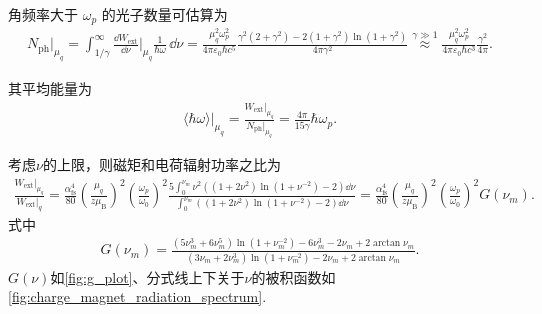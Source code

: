 角频率大于 \(\omega_{p}\) 的光子数量可估算为
\begin{align*}
	N_{\mathrm{ph}}\big|_{\mu_q} = \int_{1/\gamma}^{\infty} \frac{\dd  W_{\mathrm{ext}}}{\dd \nu}\bigg|_{\mu_q} \frac{1}{\hbar \omega} \, \dd \nu = \frac{\mu_{q}^{2} \omega_{p}^{2}}{4\pi \varepsilon_{0} \hbar c^{5}} \frac{\gamma^{2} (2 + \gamma^{2}) - 2(1 + \gamma^{2}) \ln(1 + \gamma^{2})}{4\pi \gamma^{2}} \overset{\gamma \gg 1}{\approx} \frac{\mu_{q}^{2} \omega_{p}^{2}}{4\pi \varepsilon_{0} \hbar c^{3}} \frac{\gamma^{2}}{4\pi}.
\end{align*}

其平均能量为
\begin{align*}
	\langle \hbar\omega \rangle\big|_{\mu_q} = \frac{W_{\mathrm{ext}}|_{\mu_q}}{N_{\mathrm{ph}}|_{\mu_q}} = \frac{4\pi}{15 \gamma} \hbar\omega_{p}.
\end{align*}

考虑\(\nu\)的上限，则磁矩和电荷辐射功率之比为
\begin{align*}
	\frac{W_{\mathrm{ext}}|_{\mu_{q}}}{W_{\mathrm{ext}}|_{q}} = \frac{\alpha_{\mathrm{fs}}^{4}}{80} \left( \frac{\mu_{q}}{z \mu_{\mathrm{B}}} \right)^{2} \left( \frac{\omega_{p}}{\omega_{0}} \right)^{2} \frac{5 \int_{0}^{\nu_{m}} \nu^{2} \left( (1 + 2\nu^{2}) \ln(1 + \nu^{-2}) - 2 \right) \dd \nu}{\int_{0}^{\nu_{m}} \left( (1 + 2\nu^{2}) \ln(1 + \nu^{-2}) - 2 \right) \dd \nu} = \frac{\alpha_{\mathrm{fs}}^{4}}{80} \left( \frac{\mu_{q}}{z \mu_{\mathrm{B}}} \right)^{2} \left( \frac{\omega_{p}}{\omega_{0}} \right)^{2} G(\nu_{m}).
\end{align*}
式中
\begin{align*}
	G(\nu_{m}) = \frac{(5\nu_{m}^{3} + 6\nu_{m}^{5}) \ln(1 + \nu_{m}^{-2}) - 6\nu_{m}^{3} - 2\nu_{m} + 2 \arctan\nu_{m}}{(3\nu_{m} + 2\nu_{m}^{3}) \ln(1 + \nu_{m}^{-2}) - 2\nu_{m} + 2 \arctan\nu_{m}}.
\end{align*}
\(G(\nu)\)如\cref{fig:g_plot}、分式线上下关于\(\nu\)的被积函数如\cref{fig:charge_magnet_radiation_spectrum}.


